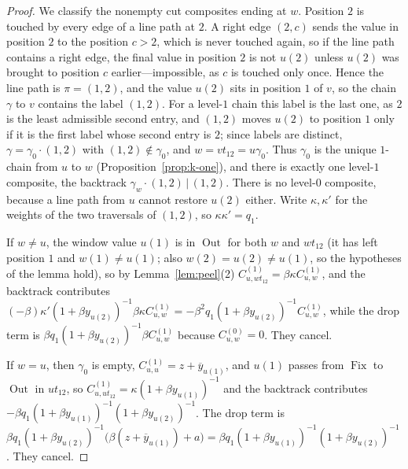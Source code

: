 \documentclass[11pt]{article}
\newcommand{\Fix}{\operatorname{Fix}}
\newcommand{\Out}{\operatorname{Out}}
\begin{document}
\begin{proof}
We classify the nonempty cut composites ending at $w$. Position $2$
is touched by every edge of a line path at $2$. A right edge $(2,c)$
sends the value in position $2$ to the position $c>2$, which is never
touched again, so if the line path contains a right edge, the final
value in position $2$ is not $u(2)$ unless $u(2)$ was brought to
position $c$ earlier---impossible, as $c$ is touched only once. Hence
the line path is $\pi=(1,2)$, and the value $u(2)$ sits in position
$1$ of $v$, so the chain $\gamma$ to $v$ contains the label $(1,2)$.
For a level-$1$ chain this label is the last one, as $2$ is the least
admissible second entry, and $(1,2)$ moves $u(2)$ to position $1$ only
if it is the first label whose second entry is $2$; since labels are
distinct, $\gamma=\gamma_0\cdot(1,2)$ with $(1,2)\notin\gamma_0$, and
$w=vt_{12}=u\gamma_0$. Thus $\gamma_0$ is the unique $1$-chain from $u$
to $w$ (Proposition~\ref{prop:k-one}), and there is exactly one
level-$1$ composite, the backtrack $\gamma_w\cdot(1,2)\,\big|\,(1,2)$.
There is no level-$0$ composite, because a line path from $u$ cannot
restore $u(2)$ either. Write $\kappa,\kappa'$ for the weights of the
two traversals of $(1,2)$, so $\kappa\kappa'=q_1$.

If $w\neq u$, the window value $u(1)$ is in $\Out$ for both $w$ and
$wt_{12}$ (it has left position $1$ and $w(1)\neq u(1)$; also
$w(2)=u(2)\neq u(1)$, so the hypotheses of the lemma hold), so by
Lemma~\ref{lem:peel}(2) $C^{(1)}_{u,wt_{12}}=\beta\kappa C^{(1)}_{u,w}$,
and the backtrack contributes
$(-\beta)\kappa'(1+\beta y_{u(2)})^{-1}\beta\kappa C^{(1)}_{u,w}
=-\beta^2q_1(1+\beta y_{u(2)})^{-1}C^{(1)}_{u,w}$,
while the drop term is $\beta q_1(1+\beta y_{u(2)})^{-1}\beta C^{(1)}_{u,w}$
because $C^{(0)}_{u,w}=0$. They cancel.

If $w=u$, then $\gamma_0$ is empty, $C^{(1)}_{u,u}=z+\overline y_{u(1)}$,
and $u(1)$ passes from $\Fix$ to $\Out$ in $ut_{12}$, so
$C^{(1)}_{u,ut_{12}}=\kappa(1+\beta y_{u(1)})^{-1}$ and the backtrack
contributes $-\beta q_1(1+\beta y_{u(1)})^{-1}(1+\beta y_{u(2)})^{-1}$.
The drop term is
$\beta q_1(1+\beta y_{u(2)})^{-1}\bigl(\beta(z+\overline y_{u(1)})+a\bigr)
=\beta q_1(1+\beta y_{u(1)})^{-1}(1+\beta y_{u(2)})^{-1}$. They cancel.
\end{proof}
\end{document}
